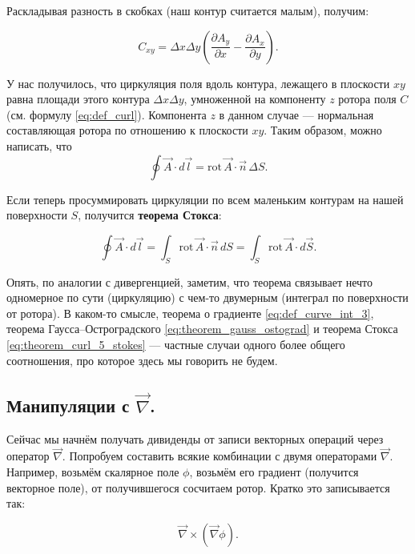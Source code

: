 \documentclass[11pt,a4paper]{article}
\numberwithin{equation}{section}
\newcommand{\pt}{\partial}
\newcommand{\rot}{\mathrm{rot}\,}
\newcommand{\vn}{\vec{\nabla}}
\begin{document}
Раскладывая разность в скобках (наш контур считается малым), получим:

\begin{equation}
  \label{eq:theorem_curl_3}
  C_{xy} = \Delta x \Delta y \left(\frac{\pt A_y}{\pt x} - \frac{\pt A_x}{\pt y}\right).
\end{equation}

У нас получилось, что циркуляция поля вдоль контура, лежащего в
плоскости $xy$ равна площади этого контура $\Delta x \Delta y$,
умноженной на компоненту $z$ ротора поля $C$ (см. формулу
\eqref{eq:def_curl}). Компонента $z$ в данном случае --- нормальная
составляющая ротора по отношению к плоскости $xy$. Таким образом,
можно написать, что
\begin{equation}
  \label{eq:theorem_curl_4}
  \oint \vec{A} \cdot d\vec{l} = \rot \vec{A} \cdot \vec{n}\, \Delta S.
\end{equation}

Если теперь просуммировать циркуляции по всем маленьким контурам на
нашей поверхности $S$, получится \textbf{теорема Стокса}:

\begin{equation}
  \label{eq:theorem_curl_5_stokes}
  \oint \vec{A} \cdot d \vec{l} = \int_S \rot \vec{A} \cdot \vec{n} \,
  dS = \int_S \rot \vec{A} \cdot d\vec{S}.
\end{equation}

Опять, по аналогии с дивергенцией, заметим, что теорема связывает
нечто одномерное по сути (циркуляцию) с чем-то двумерным (интеграл по
поверхности от ротора). В каком-то смысле, теорема о градиенте
\eqref{eq:def_curve_int_3}, теорема Гаусса--Остроградского
\eqref{eq:theorem_gauss_ostograd} и теорема Стокса
\eqref{eq:theorem_curl_5_stokes} --- частные случаи одного более
общего соотношения, про которое здесь мы говорить не будем. 

\subsection{Манипуляции с $\vn$.}
\label{sec:nabla}

Сейчас мы начнём получать дивиденды от записи векторных операций через
оператор $\vn$. Попробуем составить всякие комбинации с двумя
операторами $\vn$. Например, возьмём скалярное поле $\phi$, возьмём
его градиент (получится векторное поле), от получившегося сосчитаем
ротор. Кратко это записывается так:

\begin{equation}
  \vn \times (\vn \phi).
\end{equation}
\end{document}
